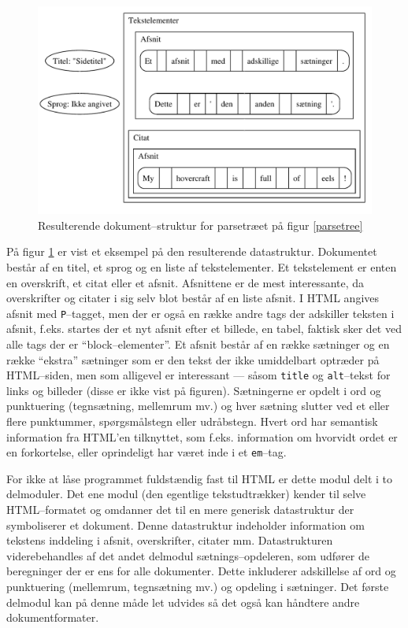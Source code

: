 \documentclass[a4paper,oneside]{memoir}
\begin{document}
\begin{figure}
  \includegraphics[width=\textwidth]{documentill.pdf}
  \caption{Resulterende dokument--struktur for parsetræet på figur
    \ref{parsetree}}
  \label{dokument}
\end{figure}

På figur \ref{dokument} er vist et eksempel på den resulterende
datastruktur. Dokumentet består af en titel, et sprog og en liste af
tekstelementer. Et tekstelement er enten en overskrift, et citat eller
et afsnit. Afsnittene er de mest interessante, da overskrifter og
citater i sig selv blot består af en liste afsnit. I HTML angives
afsnit med \texttt{P}--tagget, men der er også en række andre tags der
adskiller teksten i afsnit, f.eks. startes der et nyt afsnit efter et
billede, en tabel, faktisk sker det ved alle tags der er
``block--elementer''. Et afsnit består af en række sætninger og en
række ``ekstra'' sætninger som er den tekst der ikke umiddelbart
optræder på HTML--siden, men som alligevel er interessant --- såsom
\texttt{title} og \texttt{alt}--tekst for links og billeder (disse er
ikke vist på figuren). Sætningerne er opdelt i ord og punktuering
(tegnsætning, mellemrum mv.) og hver sætning slutter ved et eller
flere punktummer, spørgsmålstegn eller udråbstegn. Hvert ord har
semantisk information fra HTML'en tilknyttet, som f.eks. information
om hvorvidt ordet er en forkortelse, eller oprindeligt har været inde
i et \texttt{em}--tag.

For ikke at låse programmet fuldstændig fast til HTML er dette modul
delt i to delmoduler. Det ene modul (den egentlige tekstudtrækker)
kender til selve HTML--formatet og omdanner det til en mere generisk
datastruktur der symboliserer et dokument. Denne datastruktur
indeholder information om tekstens inddeling i afsnit, overskrifter,
citater mm. Datastrukturen viderebehandles af det andet delmodul
sætnings--opdeleren, som udfører de
beregninger der er ens for
alle dokumenter. Dette inkluderer adskillelse af ord og punktuering
(mellemrum, tegnsætning mv.) og opdeling i sætninger.  Det første
delmodul kan på denne måde let udvides så det også kan håndtere andre
dokumentformater.
\end{document}
